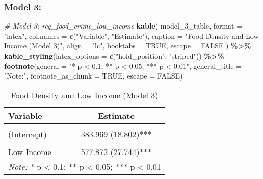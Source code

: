 \documentclass[
]{article}
\newenvironment{Shaded}{\begin{snugshade}}{\end{snugshade}}
\newcommand{\AttributeTok}[1]{\textcolor[rgb]{0.13,0.29,0.53}{#1}}
\newcommand{\CommentTok}[1]{\textcolor[rgb]{0.56,0.35,0.01}{\textit{#1}}}
\newcommand{\ConstantTok}[1]{\textcolor[rgb]{0.56,0.35,0.01}{#1}}
\newcommand{\FunctionTok}[1]{\textcolor[rgb]{0.13,0.29,0.53}{\textbf{#1}}}
\newcommand{\NormalTok}[1]{#1}
\newcommand{\SpecialCharTok}[1]{\textcolor[rgb]{0.81,0.36,0.00}{\textbf{#1}}}
\newcommand{\StringTok}[1]{\textcolor[rgb]{0.31,0.60,0.02}{#1}}
\begin{document}
\subsubsection{Model 3:}\label{model-3}

\begin{Shaded}
\begin{Highlighting}[]
\CommentTok{\# Model 3: reg\_food\_crime\_low\_income}
\FunctionTok{kable}\NormalTok{(}
\NormalTok{  model\_3\_table,}
  \AttributeTok{format =} \StringTok{"latex"}\NormalTok{,}
  \AttributeTok{col.names =} \FunctionTok{c}\NormalTok{(}\StringTok{"Variable"}\NormalTok{, }\StringTok{"Estimate"}\NormalTok{),}
  \AttributeTok{caption =} \StringTok{"Food Density and Low Income (Model 3)"}\NormalTok{,}
  \AttributeTok{align =} \StringTok{"lc"}\NormalTok{,}
  \AttributeTok{booktabs =} \ConstantTok{TRUE}\NormalTok{,}
  \AttributeTok{escape =} \ConstantTok{FALSE}
\NormalTok{) }\SpecialCharTok{\%\textgreater{}\%}
  \FunctionTok{kable\_styling}\NormalTok{(}\AttributeTok{latex\_options =} \FunctionTok{c}\NormalTok{(}\StringTok{"hold\_position"}\NormalTok{, }\StringTok{"striped"}\NormalTok{)) }\SpecialCharTok{\%\textgreater{}\%}
  \FunctionTok{footnote}\NormalTok{(}\AttributeTok{general =} \StringTok{"* p \textless{} 0.1; ** p \textless{} 0.05; *** p \textless{} 0.01"}\NormalTok{, }
           \AttributeTok{general\_title =} \StringTok{"Note:"}\NormalTok{, }
           \AttributeTok{footnote\_as\_chunk =} \ConstantTok{TRUE}\NormalTok{, }
           \AttributeTok{escape =} \ConstantTok{FALSE}\NormalTok{)}
\end{Highlighting}
\end{Shaded}

\begin{table}[!h]
\centering
\caption{\label{tab:unnamed-chunk-13}Food Density and Low Income (Model 3)}
\centering
\begin{tabular}[t]{lc}
\toprule
Variable & Estimate\\
\midrule
\cellcolor{gray!10}{Spec 3: Food Density and Low Income} & \cellcolor{gray!10}{}\\
(Intercept) & 383.969 (18.802)***\\
\cellcolor{gray!10}{Food Program Density} & \cellcolor{gray!10}{9.631 (0.897)***}\\
Low Income & 577.872 (27.744)***\\
\bottomrule
\multicolumn{2}{l}{\rule{0pt}{1em}\textit{Note:} * p < 0.1; ** p < 0.05; *** p < 0.01}\\
\end{tabular}
\end{table}
\end{document}
